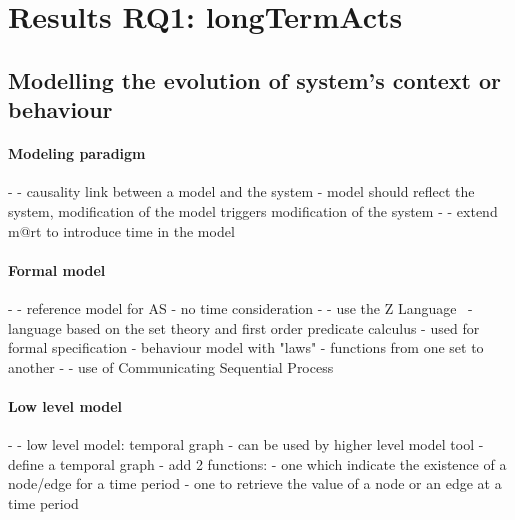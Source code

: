 \section[Results RQ1: long-term actions]{Results RQ1: \glspl{longTermAct}}
\label{sec:sota:results:actions}

\subsection[Modelling the evolution of system's context or behaviour]{Modelling the evolution of system's context or \gls{behaviour}}


\paragraph{Modeling paradigm}
- \cite{DBLP:journals/computer/BlairBF09, DBLP:journals/computer/MorinBJFS09}
	- causality link between a model and the system
	- model should reflect the system, modification of the model triggers modification of the system
- \cite{DBLP:conf/seke/0001FNMKT14, DBLP:conf/models/0001FNMKBT14}
	- extend \gls{m@rt} to introduce time in the model

\paragraph{Formal model} %
- \cite{DBLP:journals/taas/WeynsMA12}
	- reference model for AS
	- no time consideration
- \cite{DBLP:journals/taas/WeynsHH10}
	- use the Z Language~\cite{DBLP:books/daglib/0011651}
		- language based on the set theory and first order predicate calculus
		- used for formal specification
	- behaviour model with "laws"
		- functions from one set to another
- \cite{DBLP:conf/icse/BartelsK11}
	- use of Communicating Sequential Process

\paragraph{Low level model} %
- \cite{DBLP:conf/dbpl/MoffittS17}
	- low level model: temporal graph
	- can be used by higher level model tool
	- define a temporal graph
	- add 2 functions:
		- one which indicate the existence of a node/edge for a time period
		- one to retrieve the value of a node or an edge at a time period
		
